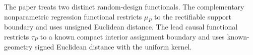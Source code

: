 The paper treats two distinct random-design functionals.  The complementary nonparametric regression functional restricts \(\mu_P\) to the rectifiable support boundary and uses unsigned Euclidean distance.  The lead causal functional restricts \(\tau_P\) to a known compact interior assignment boundary and uses known-geometry signed Euclidean distance with the uniform kernel.